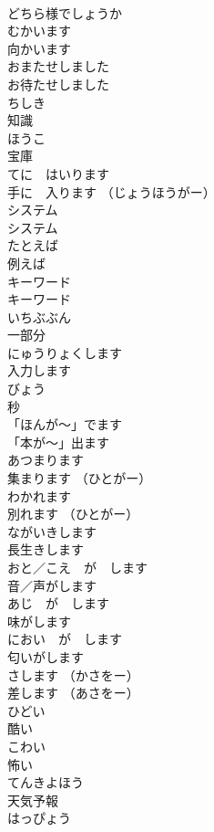 \documentclass[8pt]{extreport}
\begin{document}
\begin{CJK}{UTF8}{min}
\\	どちら様でしょうか		
\\	むかいます	
\\	向かいます		
\\	おまたせしました	
\\	お待たせしました		
\\	ちしき	
\\	知識		
\\	ほうこ	
\\	宝庫		
\\	てに　はいります	
\\	手に　入ります （じょうほうがー）		
\\	システム	
\\	システム		
\\	たとえば	
\\	例えば		
\\	キーワード	
\\	キーワード		
\\	いちぶぶん	
\\	一部分		
\\	にゅうりょくします	
\\	入力します		
\\	びょう	
\\	秒		
\\	「ほんが〜」でます	
\\	「本が〜」出ます		
\\	あつまります	
\\	集まります （ひとがー）	
\\	わかれます	
\\	別れます （ひとがー）		
\\	ながいきします	
\\	長生きします		
\\	おと／こえ　が　します	
\\	音／声がします	
\\	あじ　が　します	
\\	味がします	
\\	におい　が　します	
\\	匂いがします	
\\	さします （かさをー）	
\\	差します （あさをー）	
\\	ひどい	
\\	酷い	
\\	こわい	
\\	怖い	
\\	てんきよほう	
\\	天気予報	
\\	はっぴょう	

\end{CJK}
\end{document}
